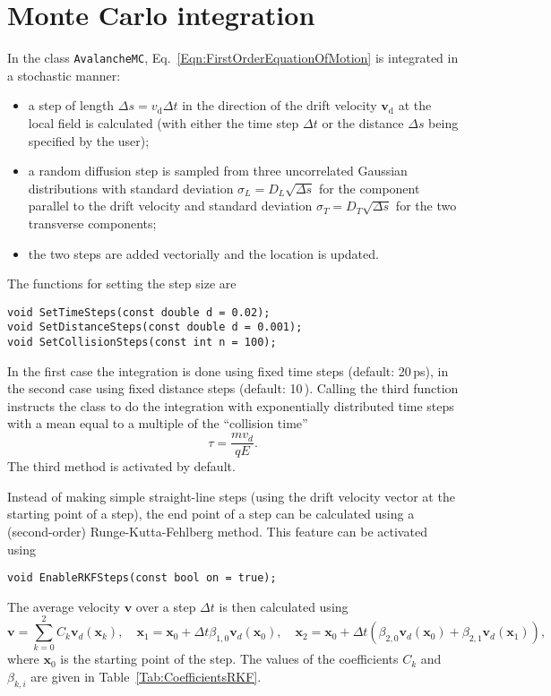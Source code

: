 \section{Monte Carlo integration}\label{Sec:DriftLineMC}
In the class \texttt{AvalancheMC}, Eq.~\eqref{Eqn:FirstOrderEquationOfMotion}
is integrated in a stochastic manner:
\begin{itemize}
  \item
  a step of length \(\Delta{s} = v_{\text{d}}\Delta{t}\) 
  in the direction of the
  drift velocity \(\mathbf{v}_{\text{d}}\) 
  at the local field is calculated (with either the 
  time step \(\Delta{t}\) or the distance \(\Delta{s}\) 
  being specified by the user);
  \item
   a random diffusion step
   is sampled from three uncorrelated Gaussian distributions
   with standard deviation \(\sigma_{L} = D_{L}\sqrt{\Delta{s}}\)
   for the component parallel to the drift velocity and
   standard deviation
   \(\sigma_{T} = D_{T}\sqrt{\Delta{s}}\) for the two
   transverse components;
   \item
   the two steps are added vectorially and the location is updated.
\end{itemize}
The functions for setting the step size are 
\begin{lstlisting}
void SetTimeSteps(const double d = 0.02);
void SetDistanceSteps(const double d = 0.001);
void SetCollisionSteps(const int n = 100);
\end{lstlisting} 
In the first case the integration is done 
using fixed time steps (default: 20\,ps), 
in the second case using fixed distance steps (default: 10\,). 
Calling the third function instructs the class to 
do the integration with exponentially distributed time steps 
with a mean equal to a multiple of the ``collision time'' 
\begin{equation*}
  \tau = \frac{m v_{d}}{q E}.
\end{equation*}
The third method is activated by default.

Instead of making simple straight-line steps (using the drift velocity 
vector at the starting point of a step), the end point of a step 
can be calculated using a (second-order) Runge-Kutta-Fehlberg method. 
This feature can be activated using
\begin{lstlisting}
void EnableRKFSteps(const bool on = true); 
\end{lstlisting}
The average velocity $\mathbf{v}$ over a step $\Delta{t}$ is then 
calculated using
\begin{equation*}
\mathbf{v} = \sum\limits_{k=0}^{2}C_{k}\mathbf{v}_{d}\left(\mathbf{x}_{k}\right), \quad 
\mathbf{x}_{1} = \mathbf{x}_{0} + \Delta{t}\beta_{1,0}\mathbf{v}_{d}\left(\mathbf{x}_{0}\right), \quad 
\mathbf{x}_{2} = \mathbf{x}_{0} + \Delta{t}\left(\beta_{2,0}\mathbf{v}_{d}\left(\mathbf{x}_{0}\right) + \beta_{2,1}\mathbf{v}_{d}\left(\mathbf{x}_{1}\right)\right),
\end{equation*}
where $\mathbf{x}_{0}$ is the starting point of the step. The values of the 
coefficients $C_{k}$ and $\beta_{k,i}$ are given in 
Table~\ref{Tab:CoefficientsRKF}.

